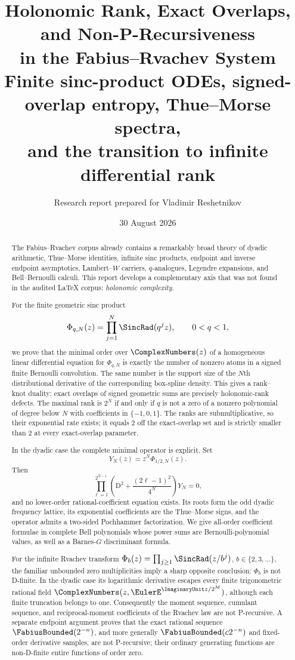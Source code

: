 \documentclass[11pt]{article}
\title{\textbf{Holonomic Rank, Exact Overlaps, and Non-P-Recursiveness\\
 in the Fabius--Rvachev System}\\[0.6em]
\large Finite sinc-product ODEs, signed-overlap entropy, Thue--Morse spectra,\\
and the transition to infinite differential rank}
\author{Research report prepared for Vladimir Reshetnikov}
\date{30 August 2026}
\numberwithin{equation}{section}
\theoremstyle{definition}
\theoremstyle{remark}
\newcommand{\D}{\mathrm D}
\begin{document}
\maketitle

\begin{abstract}
The Fabius--Rvachev corpus already contains a remarkably broad theory of dyadic
arithmetic, Thue--Morse identities, infinite sinc products, endpoint and inverse
endpoint asymptotics, Lambert--$W$ carriers, $q$-analogues, Legendre expansions,
and Bell--Bernoulli calculi.  This report develops a complementary axis that was
not found in the audited LaTeX corpus: \emph{holonomic complexity}.

For the finite geometric sinc product
\[
  \Phi_{q,N}(z)=\prod_{j=1}^{N}\SincRad(q^jz),\qquad 0<q<1,
\]
we prove that the minimal order over $\ComplexNumbers(z)$ of a homogeneous linear
differential equation for $\Phi_{q,N}$ is exactly the number of nonzero atoms in
a signed finite Bernoulli convolution.  The same number is the support size of
the $N$th distributional derivative of the corresponding box-spline density.
This gives a rank--knot duality: exact overlaps of signed geometric sums are
precisely holonomic-rank defects.  The maximal rank is $2^N$ if and only if $q$
is not a zero of a nonzero polynomial of degree below $N$ with coefficients in
$\{-1,0,1\}$.  The ranks are submultiplicative, so their exponential rate
exists; it equals $2$ off the exact-overlap set and is strictly smaller than $2$
at every exact-overlap parameter.

In the dyadic case the complete minimal operator is explicit.  Set
\[
 Y_N(z)=z^N\Phi_{1/2,N}(z).
\]
Then
\[
 \prod_{\ell=1}^{2^{N-1}}
 \left(\D^2+\frac{(2\ell-1)^2}{4^N}\right)Y_N=0,
\]
and no lower-order rational-coefficient equation exists.  Its roots form the
odd dyadic frequency lattice, its exponential coefficients are the
Thue--Morse signs, and the operator admits a two-sided Pochhammer factorization.
We give all-order coefficient formulae in complete Bell polynomials whose power
sums are Bernoulli-polynomial values, as well as a Barnes-$G$ discriminant
formula.

For the infinite Rvachev transform
$\Phi_b(z)=\prod_{j\ge1}\SincRad(z/b^j)$, $b\in\{2,3,\ldots\}$, the familiar
unbounded zero multiplicities imply a sharp opposite conclusion: $\Phi_b$ is
not D-finite.  In the dyadic case its logarithmic derivative escapes every
finite trigonometric rational field $\ComplexNumbers(z,\EulerE^{\ImaginaryUnit z/2^M})$, although each finite
truncation belongs to one.  Consequently the moment sequence, cumulant
sequence, and reciprocal-moment coefficients of the Rvachev law are not
P-recursive.  A separate endpoint argument proves that the exact rational
sequence $\FabiusBounded(2^{-n})$, and more generally
$\FabiusBounded(c2^{-n})$ and fixed-order derivative
samples, are not P-recursive; their ordinary generating functions are
non-D-finite entire functions of order zero.


\end{abstract}
\end{document}
